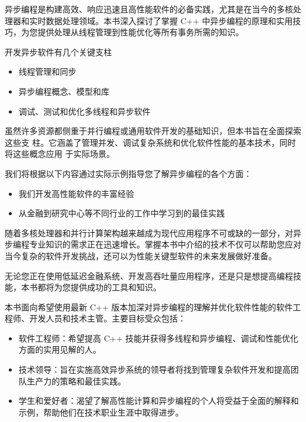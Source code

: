 

异步编程是构建高效、响应迅速且高性能软件的必备实践，尤其是在当今的多核处理器和实时数据处理领域。本书深入探讨了掌握 C++ 中异步编程的原理和实用技巧，为您提供处理从线程管理到性能优化等所有事务所需的知识。

开发异步软件有几个关键支柱

\begin{itemize}
\item
线程管理和同步

\item
异步编程概念、模型和库

\item
调试、测试和优化多线程和异步软件
\end{itemize}

虽然许多资源都侧重于并行编程或通用软件开发的基础知识，但本书旨在全面探索这些支
柱。它涵盖了管理并发、调试复杂系统和优化软件性能的基本技术，同时将这些概念应用
于实际场景。

我们将根据以下内容通过实际示例指导您了解异步编程的各个方面：

\begin{itemize}
\item
我们开发高性能软件的丰富经验

\item
从金融到研究中心等不同行业的工作中学习到的最佳实践
\end{itemize}

随着多核处理器和并行计算架构越来越成为现代应用程序不可或缺的一部分，对异步编程专业知识的需求正在迅速增长。掌握本书中介绍的技术不仅可以帮助您应对当今复杂的软件开发挑战，还可以为性能关键型软件的未来发展做好准备。

无论您正在使用低延迟金融系统、开发高吞吐量应用程序，还是只是想提高编程技能，本书都将为您提供成功的工具和知识。


本书面向希望使用最新 C++ 版本加深对异步编程的理解并优化软件性能的软件工程师、开发人员和技术主管。主要目标受众包括：

\begin{itemize}
\item
软件工程师：希望提高 C++ 技能并获得多线程和异步编程、调试和性能优化方面的实用见解的人。

\item
技术领导：旨在实施高效异步系统的领导者将找到管理复杂软件开发和提高团队生产力的策略和最佳实践。

\item
学生和爱好者：渴望了解高性能计算和异步编程的个人将受益于全面的解释和示例，帮助他们在技术职业生涯中取得进步。
\end{itemize}

